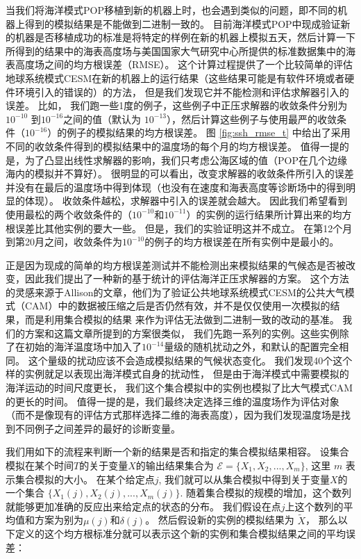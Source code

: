 当我们将海洋模式POP移植到新的机器上时，也会遇到类似的问题，即不同的机器上得到的模拟结果是不能做到二进制一致的。 
目前海洋模式POP中现成验证新的机器是否移植成功的标准是将特定的样例在新的机器上模拟五天，然后计算一下所得到的结果中的海表高度场与美国国家大气研究中心所提供的标准数据集中的海表高度场之间的均方根误差（RMSE）。
这个计算过程提供了一个比较简单的评估地球系统模式CESM在新的机器上的运行结果（这些结果可能是有软件环境或者硬件环境引入的错误的）的方法， 但是我们发现它并不能检测和评估求解器引入的误差。 
比如， 我们跑一些1度的例子，这些例子中正压求解器的收敛条件分别为$10^{-10}$ 到$10^{-16}$之间的值（默认为 $10^{-13}$），然后计算这些例子与使用最严的收敛条件（$10^{-16}$）的例子的模拟结果的均方根误差。 
图 \ref{fig:ssh_rmse_t} 中给出了采用不同的收敛条件得到的模拟结果中的温度场的每个月的均方根误差。 
值得一提的是，为了凸显出线性求解器的影响，我们只考虑公海区域的值（POP在几个边缘海内的模拟并不算好）。 
很明显的可以看出，改变求解器的收敛条件所引入的误差并没有在最后的温度场中得到体现（也没有在速度和海表高度等诊断场中的得到明显的体现）。 
收敛条件越松，求解器中引入的误差就会越大。
因此我们希望看到使用最松的两个收敛条件的（$10^{-10}$和$10^{-11}$）的实例的运行结果所计算出来的均方根误差比其他实例的要大一些。 
但是，我们的实验证明这并不成立。 
在第12个月到第20月之间，收敛条件为$10^{-10}$的例子的均方根误差在所有实例中是最小的。 


正是因为现成的简单的均方根误差测试并不能检测出来模拟结果的气候态是否被改变，因此我们提出了一种新的基于统计的评估海洋正压求解器的方案。 
这个方法的灵感来源于Allison的文章\cite{baker2014methodology}，他们为了验证公共地球系统模式CESM的公共大气模式（CAM）中的数据被压缩之后是否仍然有效，并不是仅仅使用一次模拟的结果，而是利用集合模拟的结果 来作为评估无法做到二进制一致的改动的基准。 
我们的方案和这篇文章所提到的方案很类似\cite{baker2014methodology}， 我们先跑一系列的实例。这些实例除了在初始的海洋温度场中加入了$10^{-14}$量级的随机扰动之外，和默认的配置完全相同。 
这个量级的扰动应该不会造成模拟结果的气候状态变化。 
我们发现40个这个样的实例就足以表现出海洋模式自身的扰动性， 但是由于海洋模式中需要模拟的海洋运动的时间尺度更长， 我们这个集合模拟中的实例也模拟了比大气模式CAM的更长的时间。 
值得一提的是，我们最终决定选择三维的温度场作为评估对象（而不是像现有的评估方式那样选择二维的海表高度），因为我们发现温度场是找到不同例子之间差异的最好的诊断变量。 
 




 
我们用如下的流程来判断一个新的结果是否和指定的集合模拟结果相容。 
设集合模拟在某个时间$T$的关于变量$X$的输出结果集合为 $\mathcal{E}=\{X_1,X_2,...,X_m\}$, 这里
$m$ 表示集合模拟的大小。 
在某个给定点$j$, 我们就可以从集合模拟中得到关于变量$X$的一个集合
  $\{X_1(j),X_2(j),...,X_m(j)\}$.
随着集合模拟的规模的增加，这个数列就能够更加准确的反应出来给定点的状态的分布。 
我们假设在点$j$上这个数列的平均值和方案为别为$\mu (j) $和$\delta (j)$。 
然后假设新的实例的模拟结果为 $\tilde{X}$， 那么以下定义的这个均方根标准分就可以表示这个新的实例和集合模拟结果之间的平均误差：

